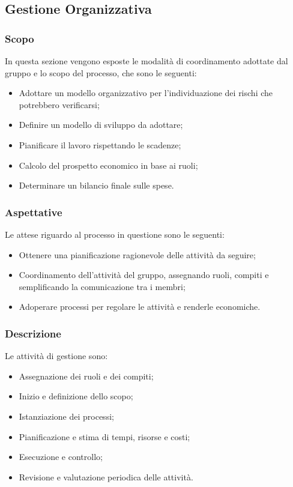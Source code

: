 \subsection{Gestione Organizzativa}
\subsubsection{Scopo}
In questa sezione vengono esposte le modalità di coordinamento adottate dal gruppo e lo scopo del processo, che sono le seguenti:
\begin{itemize}
\item Adottare un modello organizzativo per l'individuazione dei rischi che potrebbero verificarsi;
\item Definire un modello di sviluppo da adottare;
\item Pianificare il lavoro rispettando le scadenze;
\item Calcolo del prospetto economico in base ai ruoli;
\item Determinare un bilancio finale sulle spese.
\end{itemize}

\subsubsection{Aspettative}
Le attese riguardo al processo in questione sono le seguenti: 
\begin{itemize}
\item Ottenere una pianificazione ragionevole delle attività da seguire;
\item Coordinamento dell'attività del gruppo, assegnando ruoli, compiti e semplificando la comunicazione tra i membri;
\item Adoperare processi per regolare le attività e renderle economiche.
\end{itemize}

\subsubsection{Descrizione}
Le attività  di gestione sono: 
\begin{itemize}
\item Assegnazione dei ruoli e dei compiti;
\item Inizio e definizione dello scopo;
\item Istanziazione dei processi;
\item Pianificazione e stima di tempi, risorse e costi;
\item Esecuzione e controllo;
\item Revisione e valutazione periodica delle attività.
\end{itemize}

